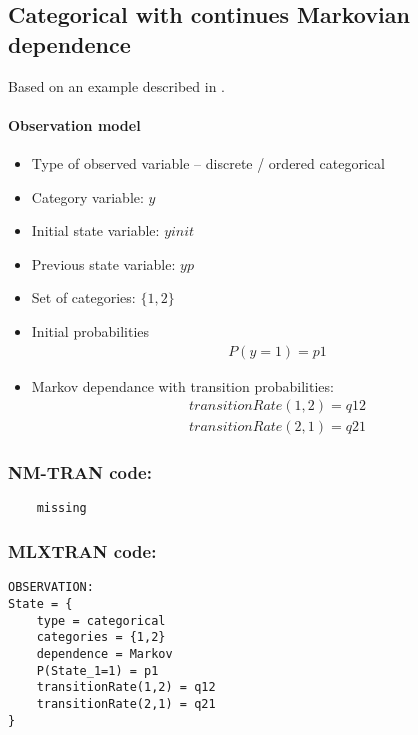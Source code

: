 \subsection{Categorical with continues Markovian dependence}
Based on an example described in \cite{MLXTRANforMonolix:2014}. 

\paragraph{Observation model}

\begin{itemize}
\item
Type of observed variable -- discrete / ordered categorical
\item
Category variable: $y$
\item
Initial state variable: $yinit$
\item
Previous state variable: $yp$
\item
Set of categories: $\{1,2\}$
\item
Initial probabilities
\begin{align}
& P(y=1) = p1 \nonumber
\end{align}
\item
Markov dependance with transition probabilities:
\begin{align}
& transitionRate(1,2) = q12  \nonumber \\
& transitionRate(2,1) = q21 \nonumber 
\end{align}
\end{itemize}

\subsubsection{NM-TRAN code:}

\myStartLine

\lstset{language=NONMEMdataSet}
\begin{lstlisting}
	missing
\end{lstlisting}

\myEndLine

\subsubsection{MLXTRAN code:}

\myStartLine

\lstset{language=MLXTRANcode}
\begin{lstlisting}
OBSERVATION:
State = {
	type = categorical
	categories = {1,2}
	dependence = Markov
	P(State_1=1) = p1
	transitionRate(1,2) = q12
	transitionRate(2,1) = q21
}
\end{lstlisting}

